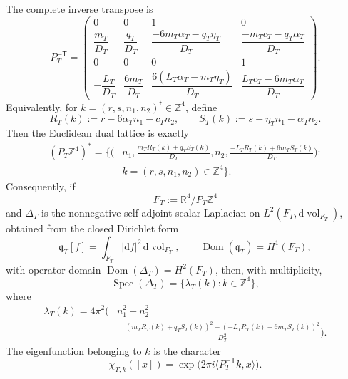 \begin{proposition}
The complete inverse transpose is
\begin{equation}
 P_T^{-\mathsf T}=
 \begin{pmatrix}
 0&0&1&0\\[2pt]
 \dfrac{m_T}{D_T}&\dfrac{q_T}{D_T}&
 \dfrac{-6m_T\alpha_T-q_T\eta_T}{D_T}&
 \dfrac{-m_Tc_T-q_T\alpha_T}{D_T}\\[7pt]
 0&0&0&1\\[2pt]
 -\dfrac{L_T}{D_T}&\dfrac{6m_T}{D_T}&
 \dfrac{6(L_T\alpha_T-m_T\eta_T)}{D_T}&
 \dfrac{L_Tc_T-6m_T\alpha_T}{D_T}
 \end{pmatrix}.
 \label{cusp-spec-full-inverse-transpose}
\end{equation}
Equivalently, for
\(k=(r,s,n_1,n_2)^{\mathsf t}\in\mathbb Z^4\), define
\begin{equation}
 R_T(k):=r-6\alpha_Tn_1-c_Tn_2,
 \qquad
 S_T(k):=s-\eta_Tn_1-\alpha_Tn_2.
 \label{cusp-spec-shifted-indices}
\end{equation}
Then the Euclidean dual lattice is exactly
\begin{equation}
 \begin{split}
 (P_T\mathbb Z^4)^*
 =\biggl\{\biggl(&n_1,
 \frac{m_TR_T(k)+q_TS_T(k)}{D_T},n_2,
 \frac{-L_TR_T(k)+6m_TS_T(k)}{D_T}\biggr):\\[-2pt]
 &k=(r,s,n_1,n_2)\in\mathbb Z^4\biggr\}.
 \end{split}
 \label{cusp-spec-exact-dual-lattice-formula}
\end{equation}
Consequently, if
\[
 F_T:=\mathbb R^4/P_T\mathbb Z^4
\]
 and \(\Delta_T\) is the nonnegative self-adjoint scalar Laplacian on
 \(L^2(F_T,\mathrm d\operatorname{vol}_{F_T})\), obtained from the closed
 Dirichlet form
 \[
  \mathfrak q_T[f]=\int_{F_T}|\mathrm df|^2\,
       \mathrm d\operatorname{vol}_{F_T},
  \qquad \operatorname{Dom}(\mathfrak q_T)=H^1(F_T),
 \]
 with operator domain \(\operatorname{Dom}(\Delta_T)=H^2(F_T)\), then, with
multiplicity,
\begin{equation}
 \operatorname{Spec}(\Delta_T)
 =\{\lambda_T(k):k\in\mathbb Z^4\},
 \label{cusp-spec-spectrum-set}
\end{equation}
where
\begin{equation}
 \begin{aligned}
 \lambda_T(k)=4\pi^2\biggl(&n_1^2+n_2^2\\
 &+\frac{(m_TR_T(k)+q_TS_T(k))^2
       +(-L_TR_T(k)+6m_TS_T(k))^2}{D_T^2}\biggr).
 \end{aligned}
 \label{cusp-spec-exact-eigenvalue}
\end{equation}
The eigenfunction belonging to \(k\) is the character
\begin{equation}
 \chi_{T,k}([x])
 =\exp\bigl(2\pi i\langle P_T^{-\mathsf T}k,x\rangle\bigr).
 \label{cusp-spec-characters}
\end{equation}
\end{proposition}

